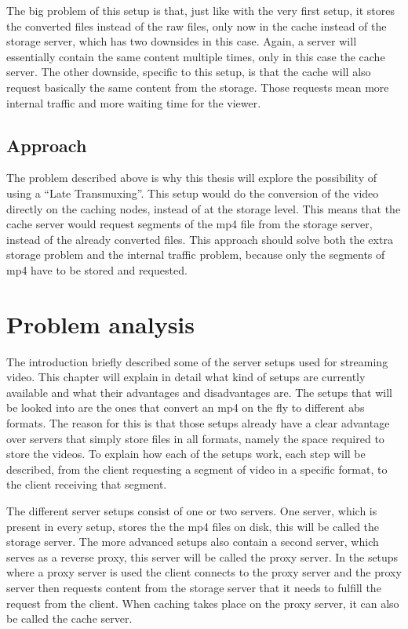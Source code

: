\documentclass[twoside,openright]{uva-bachelor-thesis}
\begin{document}
The big problem of this setup is that, just like with the very first setup, it
stores the converted files instead of the raw files, only now in the cache
instead of the storage server, which has two downsides in this case. Again, a
server will essentially contain the same content multiple times, only in this
case the cache server. The other downside, specific to this setup, is that the
cache will also request basically the same content from the storage. Those
requests mean more internal traffic and more waiting time for the viewer.

\section{Approach}
The problem described above is why this thesis will explore the possibility of
using a ``Late Transmuxing''. This setup would do the conversion of the video
directly on the caching nodes, instead of at the storage level. This means that
the cache server would request segments of the mp4 file from the storage server,
instead of the already converted files. This approach should solve both the
extra storage problem and the internal traffic problem, because only the segments
of mp4 have to be stored and requested.






\chapter{Problem analysis}\label{ch:problem}
The introduction briefly described some of the server setups used for streaming
video. This chapter will explain in detail what kind of setups are currently
available and what their advantages and disadvantages are. The setups that will
be looked into are the ones that convert an mp4 on the fly to different
\gls{abs} formats. The reason for this is that those setups already have a clear
advantage over servers that simply store files in all formats, namely the space
required to store the videos. To explain how each of the setups work, each step
will be described, from the client requesting a segment of video in a specific
format, to the client receiving that segment.

The different server setups consist of one or two servers. One server, which is
present in every setup, stores the the mp4 files on disk, this will be called
the storage server. The more advanced setups also contain a second server, which
serves as a reverse proxy, this server will be called the proxy server. In the
setups where a proxy server is used the client connects to the proxy server and
the proxy server then requests content from the storage server that it needs
to fulfill the request from the client. When caching takes place on the proxy
server, it can also be called the cache server.
\end{document}
